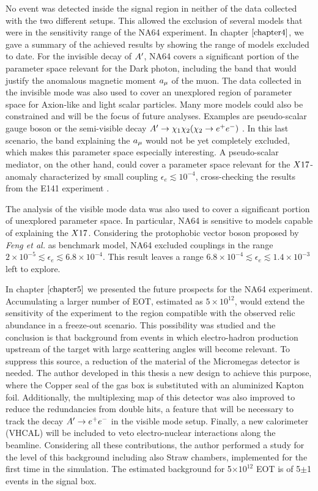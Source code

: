 No event was detected inside the signal region in neither of the data collected with the two different setups. This allowed the exclusion of several models that were in the sensitivity range of the NA64 experiment. In chapter $\ref{chapter4}$, we gave a summary of the achieved results by showing the range of models excluded to date. For the invisible decay of $A'$, NA64 covers a significant portion of the parameter space relevant for the Dark photon, including the band that would justify the anomalous magnetic moment $a_{\mu}$ of the muon.
The data collected in the invisible mode was also used to cover an unexplored region of parameter space for Axion-like and light scalar particles. Many more models could also be constrained and will be the focus of future analyses. Examples are pseudo-scalar gauge boson or the semi-visible decay $A' \to \chi_1 \chi_2 (\chi_2 \to e^+e^-)$ \cite{Mohlabeng_2019}. In this last scenario, the band explaining the $a_{\mu}$ would not be yet completely excluded, which makes this parameter space especially interesting. A pseudo-scalar mediator, on the other hand, could cover a parameter space relevant for the $X17$-anomaly characterized by small coupling $\epsilon_e \lesssim 10^{-4}$, cross-checking the results from the E141 experiment \cite{blum}.

The analysis of the visible mode data was also used to cover a significant portion of unexplored parameter space. In particular, NA64 is sensitive to models capable of explaining the $X17$. Considering the protophobic vector boson proposed by \textit{Feng et al.}\cite{Feng:2016jff} as benchmark model, NA64 excluded couplings in the range $2 \times 10^{-5} \lesssim \epsilon_e \lesssim 6.8 \times 10^{-4}$. This result leaves a range $6.8 \times 10^{-4} \lesssim \epsilon_e \lesssim 1.4 \times 10^{-3}$ left to explore.

In chapter $\ref{chapter5}$ we presented the future prospects for the NA64 experiment. Accumulating a larger number of EOT, estimated as $5 \times 10^{12}$, would extend the sensitivity of the experiment to the region compatible with the observed relic abundance in a freeze-out scenario. This possibility was studied and the conclusion is that background from events in which electro-hadron production upstream of the target with large scattering angles will become relevant. To suppress this source, a reduction of the material of the Micromegas detector is needed. The author developed in this thesis a new design to achieve this purpose, where the Copper seal of the gas box is substituted with an aluminized Kapton foil. Additionally, the multiplexing map of this detector was also improved to reduce the redundancies from double hits, a feature that will be necessary to track the decay $A' \to e^+e^-$ in the visible mode setup. Finally, a new calorimeter (VHCAL) will be included to veto electro-nuclear interactions along the beamline. Considering all these contributions, the author performed a study for the level of this background including also Straw chambers, implemented for the first time in the simulation. The estimated background for 5$\times 10^{12}$ EOT is of 5$\pm$1 events in the signal box.

